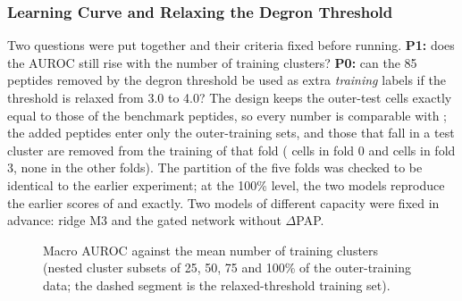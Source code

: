 \subsubsection{Learning Curve and Relaxing the Degron Threshold}\label{sec:res-curve}
Two questions were put together and their criteria fixed before running. \textbf{P1:} does the AUROC still rise
with the number of training clusters? \textbf{P0:} can the 85 peptides removed by the degron threshold be
used as extra \emph{training} labels if the threshold is relaxed from 3.0 to 4.0? The design keeps the
outer-test cells exactly equal to those of the \nNPep{} benchmark peptides, so every number is comparable with
\nAucRidge{}; the added peptides enter only the outer-training sets, and those that fall in a test cluster
are removed from the training of that fold (\nExclFoldZero{} cells in fold 0 and \nExclFoldThree{} cells in fold 3,
none in the other folds). The partition of the five folds was checked to be identical to the earlier experiment; at the 100\% level, the two
models reproduce the earlier scores of \nAucRidge{} and \nAucGateNoPap{} exactly. Two models of different capacity
were fixed in advance: ridge M3 and the gated network without $\Delta$PAP.

\begin{figure}[htbp]
  \centering
  
  \caption{Macro AUROC against the mean number of training clusters (nested cluster subsets of 25, 50, 75 and 100\%
  of the outer-training data; the dashed segment is the relaxed-threshold training set).}\label{fig:curve}
\end{figure}

\begin{table}[htbp]
  \centering
  \caption{Learning curve (P1) and relaxed degron threshold 4.0 (P0). Ranges are over 5 folds and 3 seeds.}\label{tab:curve}
  
\end{table}

